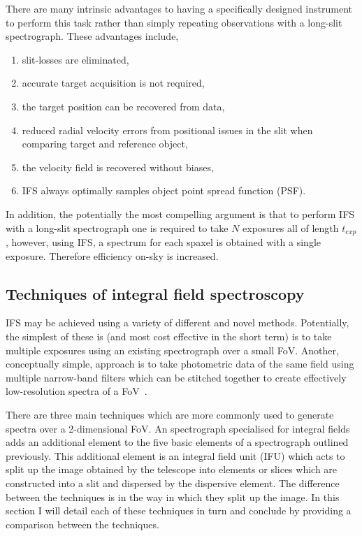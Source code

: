 There are many intrinsic advantages to having a specifically designed instrument to perform this task rather than simply repeating observations with a long-slit spectrograph.
These advantages include,

\begin{enumerate}
    \item slit-losses are eliminated,
    \item accurate target acquisition is not required,
    \item the target position can be recovered from data,
    \item reduced radial velocity errors from positional issues in the slit when comparing target and reference object,
    \item the velocity field is recovered without biases,
    \item IFS always optimally samples object point spread function (PSF).
\end{enumerate}

In addition, the potentially the most compelling argument is that to perform IFS with a long-slit spectrograph one is required to take $N$ exposures all of length $t_{exp}$, however, using IFS, a spectrum for each spaxel is obtained with a single exposure. Therefore efficiency on-sky is increased.


\subsection{Techniques of integral field spectroscopy} %
\label{sub:techniques_of_integral_field_spectroscopy}

IFS may be achieved using a variety of different and novel methods.
Potentially, the simplest of these is (and most cost effective in the short term) is to take multiple exposures using an existing spectrograph over a small FoV.
Another, conceptually simple, approach is to take photometric data of the same field using multiple narrow-band filters which can be stitched together to create effectively low-resolution spectra of a FoV~\citep[e.g. GTC-OSIRIS][]{2011PASP..123.1107M}.


There are three main techniques which are more commonly used to generate spectra over a 2-dimensional FoV.
An spectrograph specialised for integral fields adds an additional element to the five basic elements of a spectrograph outlined previously.
This additional element is an integral field unit (IFU) which acts to split up the image obtained by the telescope into elements or slices which are constructed into a slit and dispersed by the dispersive element.
The difference between the techniques is in the way in which they split up the image.
In this section I will detail each of these techniques in turn and conclude by providing a comparison between the techniques.

